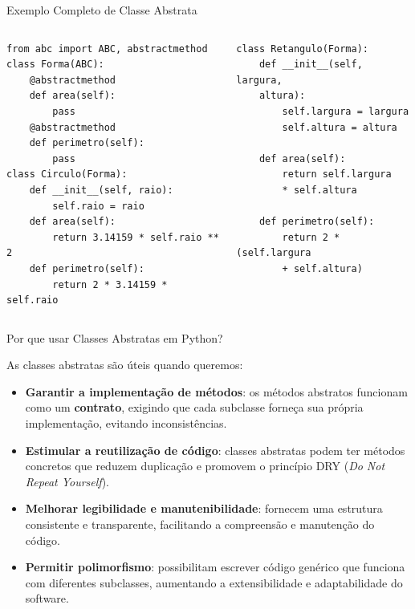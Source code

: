 \begin{frame}[fragile]{Exemplo Completo de Classe Abstrata}
\small
\begin{columns}[T]

\begin{column}{0.48\textwidth}
\begin{verbatim}
from abc import ABC, abstractmethod
class Forma(ABC):
    @abstractmethod
    def area(self):
        pass
    @abstractmethod
    def perimetro(self):
        pass
class Circulo(Forma):
    def __init__(self, raio):
        self.raio = raio
    def area(self):
        return 3.14159 * self.raio ** 2
    def perimetro(self):
        return 2 * 3.14159 * self.raio
\end{verbatim}
\end{column}

\begin{column}{0.48\textwidth}
\begin{verbatim}
class Retangulo(Forma):
    def __init__(self, largura,
    altura):
        self.largura = largura
        self.altura = altura

    def area(self):
        return self.largura
        * self.altura

    def perimetro(self):
        return 2 * (self.largura
        + self.altura)
\end{verbatim}
\end{column}

\end{columns}
\end{frame}



\begin{frame}{Por que usar Classes Abstratas em Python?}

As classes abstratas são úteis quando queremos:

\begin{itemize}
    \item \textbf{Garantir a implementação de métodos}: os métodos abstratos funcionam como um \textbf{contrato}, exigindo que cada subclasse forneça sua própria implementação, evitando inconsistências.
    \item \textbf{Estimular a reutilização de código}: classes abstratas podem ter métodos concretos que reduzem duplicação e promovem o princípio DRY (\textit{Do Not Repeat Yourself}).
    \item \textbf{Melhorar legibilidade e manutenibilidade}: fornecem uma estrutura consistente e transparente, facilitando a compreensão e manutenção do código.
    \item \textbf{Permitir polimorfismo}: possibilitam escrever código genérico que funciona com diferentes subclasses, aumentando a extensibilidade e adaptabilidade do software.
\end{itemize}

\end{frame}



